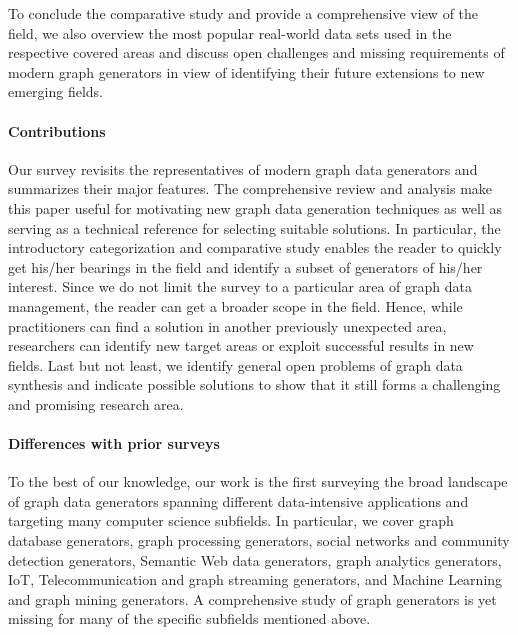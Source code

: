 To conclude the comparative study and provide a comprehensive view of the
field,  we also overview the most popular real-world data sets used in the respective covered areas and discuss open challenges and missing requirements of modern
graph generators in view of identifying their future extensions to new emerging fields.


\paragraph*{Contributions} Our survey revisits the representatives of
modern graph data generators and summarizes their major features. The comprehensive review and analysis make this paper useful for motivating new graph data generation techniques as well as serving as a technical reference for selecting suitable solutions. In particular, the introductory categorization and comparative study enables the reader to quickly get his/her bearings in the field and identify a subset of generators of his/her interest. Since we do not limit the survey to a particular area of graph data management,  the reader can get a broader scope in the field. Hence, while practitioners can find a solution in another previously unexpected area, researchers can identify new target areas or exploit successful results in new fields. Last but not least, we identify general open problems of graph data synthesis and indicate possible solutions to show that it still forms a challenging and promising research area.

\paragraph*{Differences with prior surveys}

To the best of our knowledge, our work is the first surveying the broad
landscape of graph data generators spanning different data-intensive applications and
targeting many computer science subfields. In particular, we cover graph database
generators, graph processing generators, social networks and community detection
generators, Semantic Web data generators, graph
analytics generators, IoT, Telecommunication and graph streaming generators,
and Machine Learning and graph mining generators. A comprehensive study of
graph generators is yet missing for many of the specific subfields mentioned
above.


